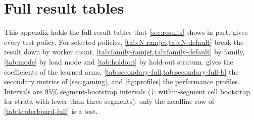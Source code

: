 %

\section{Full result tables}
\label{app:tables}

This appendix holds the full result tables that \cref{sec:results} shows in part.
 gives every test policy. For selected policies,
\cref{tab:N-ramjet,tab:N-default} break the result down by worker count,
\cref{tab:family-ramjet,tab:family-default} by family, \cref{tab:mode} by load mode and
\cref{tab:holdout} by hold-out stratum.  gives the coefficients of the
 learned arms, \cref{tab:secondary-full,tab:secondary-full-b} the secondary metrics of
\cref{sec:gaming}, and \cref{fig:profiles} the performance profiles. Intervals are 95\%
segment-bootstrap intervals ($\dagger$: within-segment cell bootstrap for strata with fewer than
three segments); only the headline row of \cref{tab:leaderboard-full} is a test.



\begin{table}[htbp]
  \centering
  \caption{By worker count, against tuned  (selected rows). Segment means
    with 95\% intervals. Cells (segments) per $\Nw$: 2: 8 (6); 4: 13 (7); 6: 7 (6),
    selection-exposed; 8: 17 (8); 16: 7 (6); 32: 8 (6).  gives the same against
    $\piref$.}
  \label{tab:N-ramjet}
  
\end{table}

\begin{table}[htbp]
  \centering
  \caption{By worker count, against $\piref$ (selected rows).}
  \label{tab:N-default}
  
\end{table}

\begin{table}[htbp]
  \centering
  \caption{By family, against tuned  (selected rows). Each family has 2 to
    4 segments, so these are descriptive; $\dagger$ marks the within-segment cell bootstrap.
     gives the same against $\piref$.}
  \label{tab:family-ramjet}
  
\end{table}

